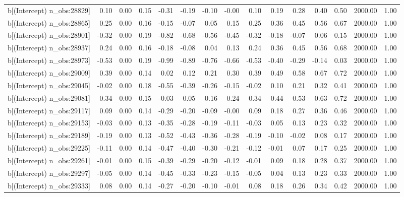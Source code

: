 \begin{table}[ht]
\begin{tabular}{rrrrrrrrrrrrrrr}
  b[(Intercept) n\_obs:28829] & 0.10 & 0.00 & 0.15 & -0.31 & -0.19 & -0.10 & -0.00 & 0.10 & 0.19 & 0.28 & 0.40 & 0.50 & 2000.00 & 1.00 \\ 
  b[(Intercept) n\_obs:28865] & 0.25 & 0.00 & 0.16 & -0.15 & -0.07 & 0.05 & 0.15 & 0.25 & 0.36 & 0.45 & 0.56 & 0.67 & 2000.00 & 1.00 \\ 
  b[(Intercept) n\_obs:28901] & -0.32 & 0.00 & 0.19 & -0.82 & -0.68 & -0.56 & -0.45 & -0.32 & -0.18 & -0.07 & 0.06 & 0.15 & 2000.00 & 1.00 \\ 
  b[(Intercept) n\_obs:28937] & 0.24 & 0.00 & 0.16 & -0.18 & -0.08 & 0.04 & 0.13 & 0.24 & 0.36 & 0.45 & 0.56 & 0.68 & 2000.00 & 1.00 \\ 
  b[(Intercept) n\_obs:28973] & -0.53 & 0.00 & 0.19 & -0.99 & -0.89 & -0.76 & -0.66 & -0.53 & -0.40 & -0.29 & -0.14 & 0.03 & 2000.00 & 1.00 \\ 
  b[(Intercept) n\_obs:29009] & 0.39 & 0.00 & 0.14 & 0.02 & 0.12 & 0.21 & 0.30 & 0.39 & 0.49 & 0.58 & 0.67 & 0.72 & 2000.00 & 1.00 \\ 
  b[(Intercept) n\_obs:29045] & -0.02 & 0.00 & 0.18 & -0.55 & -0.39 & -0.26 & -0.15 & -0.02 & 0.10 & 0.21 & 0.32 & 0.41 & 2000.00 & 1.00 \\ 
  b[(Intercept) n\_obs:29081] & 0.34 & 0.00 & 0.15 & -0.03 & 0.05 & 0.16 & 0.24 & 0.34 & 0.44 & 0.53 & 0.63 & 0.72 & 2000.00 & 1.00 \\ 
  b[(Intercept) n\_obs:29117] & 0.09 & 0.00 & 0.14 & -0.29 & -0.20 & -0.09 & -0.00 & 0.09 & 0.18 & 0.27 & 0.36 & 0.46 & 2000.00 & 1.00 \\ 
  b[(Intercept) n\_obs:29153] & -0.03 & 0.00 & 0.13 & -0.35 & -0.28 & -0.19 & -0.11 & -0.03 & 0.05 & 0.13 & 0.23 & 0.32 & 2000.00 & 1.00 \\ 
  b[(Intercept) n\_obs:29189] & -0.19 & 0.00 & 0.13 & -0.52 & -0.43 & -0.36 & -0.28 & -0.19 & -0.10 & -0.02 & 0.08 & 0.17 & 2000.00 & 1.00 \\ 
  b[(Intercept) n\_obs:29225] & -0.11 & 0.00 & 0.14 & -0.47 & -0.40 & -0.30 & -0.21 & -0.12 & -0.01 & 0.07 & 0.17 & 0.25 & 2000.00 & 1.00 \\ 
  b[(Intercept) n\_obs:29261] & -0.01 & 0.00 & 0.15 & -0.39 & -0.29 & -0.20 & -0.12 & -0.01 & 0.09 & 0.18 & 0.28 & 0.37 & 2000.00 & 1.00 \\ 
  b[(Intercept) n\_obs:29297] & -0.05 & 0.00 & 0.14 & -0.45 & -0.33 & -0.23 & -0.15 & -0.05 & 0.04 & 0.13 & 0.23 & 0.33 & 2000.00 & 1.00 \\ 
  b[(Intercept) n\_obs:29333] & 0.08 & 0.00 & 0.14 & -0.27 & -0.20 & -0.10 & -0.01 & 0.08 & 0.18 & 0.26 & 0.34 & 0.42 & 2000.00 & 1.00 \\ 

\end{tabular}
\end{table}
